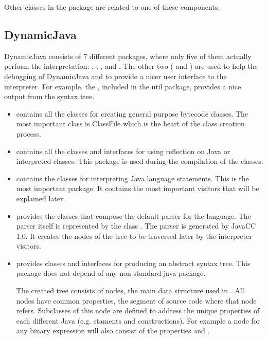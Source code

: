 Other classes in the  package are related to one of these components.

\subsection{DynamicJava}
\label{sec:DynamicJava}

DynamicJava consists of 7 different packages, where only five
of them actually perform the interpretation: , ,
,  and . The other two ( and ) are
used to help the debugging of DynamicJava and to provide a nicer
user interface to the interpreter. For example, the ,
included in the util package, provides a nice output from the syntax tree.

\begin{itemize}
\item {} contains all the classes for creating general purpose bytecode
classes. The most important class is ClassFile which is the heart
of the class creation process.

\item {} contains all the classes and interfaces for using reflection
on Java or interpreted classes. This package is used during
the compilation of the classes.

\item {} contains the classes for interpreting Java language statements.
This is the most important package. It contains the most important
visitors that will be explained later.

\item {} provides the classes that compose the default parser for the
language. The parser itself is represented by the class .
The parser is generated by JavaCC 1.0. It creates the nodes of the
tree to be traversed later by the interpreter visitors.

\item {} provides classes and interfaces for producing an abstract syntax
tree. This package does not depend of any non standard java package.

The created tree consists of nodes, the main data structure used
in \djava{}. All nodes have common properties, the segment
of source code where that node refers. Subclasses of this node
are defined to address the unique properties of each different
Java (e.g. staments and constructions). For example a node for
any binary expression will also consist of the properties 
and .

\end{itemize}


